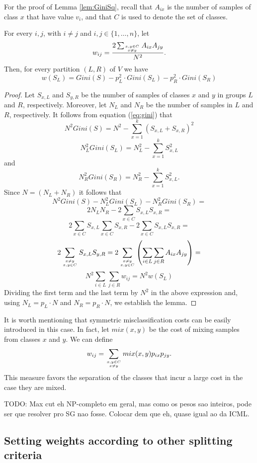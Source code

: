 For the proof of Lemma \ref{lem:GiniSq}, recall that $A_{ix}$ is the number
of samples of  class $x$ that have value $v_i$, and that $C$ is used to denote the set of classes.


\begin{lemma}
For every $i,j$, with $i \ne j$ and $i,j \in \{1,\ldots,n\}$,  let
$$ w_{ij} = \frac{ 2 \sum_{ x,y \in C \atop x \ne y }  A_{ix} A_{jy} }{ N^2}.$$
Then, for every partition $(L,R)$ of  $V$ we have
$$w(S_L)=Gini(S) - p^2_L \cdot Gini(S_L) - p^2_R \cdot Gini(S_R)$$
\label{lem:GiniSq}
\end{lemma}

\begin{proof}
Let $S_{x,L}$ and $S_{y,R}$  be the number of samples of classes $x$ and $y$ in groups $L$
and $R$, respectively. Moreover, let  $N_L$ and $N_R$ be 
the number of samples in $L$ and $R$, respectively.
It follows from equation (\ref{eq:gini}) that
$$N^2 Gini(S)=  N^2 -  \sum_{x=1}^k (S_{x,L} + S_{x,R})^2 $$
$$N_L^2 Gini(S_L)=  N_L^2 - \sum_{x=1}^k S_{x,L}^2 $$
and
$$N_R^2 Gini(S_R)= N_R^2 - \sum_{x=1}^k S_{x,L}^2. $$ 
Since $N=(N_L+N_R)$ it follows that 
$$N^2 Gini(S) - N_L^2 Gini(S_L)  - N_R^2 Gini(S_R) =$$
$$ 2 N_L N_R - 2 \sum_{x \in C} S_{x,L} S_{x,R} = $$
$$ 2  \sum_{x \in C } S_{x,L} \sum_{x \in C} S_{x,R}  - 2 \sum_{x \in C} S_{x,L} S_{x,R} =$$  
$$ 2  \sum_{ x \neq y \atop x,y \in C } S_{x,L} S_{y,R} =  2 \sum_{ x \neq y \atop x,y \in C } \left ( \sum_{ i \in L   }\sum_{ j \in R   }  A_{ix}A_{jy} \right ) =$$
$$ N^2 \sum_{i \in L  } \sum_{j \in R  } w_{ij} =  N^2 w(S_L) $$
Dividing the first term and the last term by $N^2$ in the  above expression and, using
 $N_L=p_L \cdot N$ and $N_R=p_R \cdot N$,
we  establish 
the lemma.
\end{proof}


It is worth mentioning that symmetric 
misclassification costs can be easily introduced in this case.
In fact, let $mix(x,y)$  be the cost 	
of  mixing  samples from classes $x$ and $y$.
We can define 
$$ w_{ij} =   \sum_{ x,y \in C \atop x \ne y } mix(x,y)  p_{ix} p_{jy} .$$
This measure favors the separation of the classes
that incur  a large cost in the case they are mixed.

TODO: Max cut eh NP-completo em geral, mas como os pesos sao inteiros, pode ser que resolver pro SG nao fosse. Colocar dem que eh, quase igual ao da ICML.

\subsection{Setting weights according to other splitting criteria}

